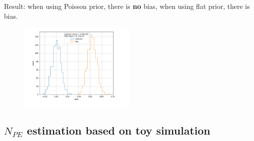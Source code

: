 \documentclass[notitlepage]{article}
\begin{document}
Result: when using Poisson prior, there is \textbf{no} bias, when using flat prior, there is bias. 

\begin{figure}[H]
    \centering
    \includegraphics[width=0.5\textwidth]{onebinbias.png}
\end{figure}

\subsection{$N_{PE}$ estimation based on toy simulation}
\end{document}
